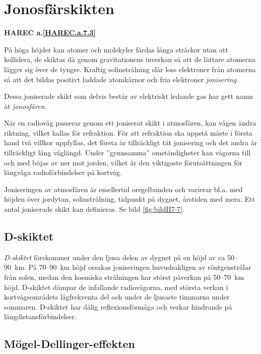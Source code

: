 \section{Jonosfärskikten}
\textbf{
HAREC a.\ref{HAREC.a.7.3}\label{myHAREC.a.7.3}
}

På höga höjder kan atomer och molekyler färdas långa sträckor utan att
kollidera, de skiktas då genom gravitationens inverkan så att de lättare
atomerna lägger sig över de tyngre.
Kraftig solinstrålning slår loss elektroner från atomerna så att det bildas
positivt laddade atomkärnor och fria elektroner \emph{jonisering}.

Dessa joniserade skikt som delvis består av elektriskt ledande gas har
gett namn åt \emph{jonosfären}.

När en radiovåg passerar genom ett joniserat skikt i atmosfären, kan
vågen ändra riktning, vilket kallas för refraktion.  För att
refraktion ska uppstå måste i första hand två villkor uppfyllas, det
första är tillräckligt tät jonisering och det andra är tillräckligt
lång våglängd.
Under ''gynnsamma'' omständigheter kan vågorna till och med böjas av
ner mot jorden, vilket är den viktigaste förutsättningen för långväga
radioförbindelser på kortvåg.

Joniseringen av atmosfären är emellertid oregelbunden och varierar
bl.a. med höjden över jordytan, solinstrålning, tidpunkt på dygnet,
årstiden med mera.  Ett antal joniserade skikt kan definieras.  Se
bild \ref{fig:bildII7-7}.

\subsection{D-skiktet}

\emph{D-skiktet} förekommer under den ljusa delen av dygnet på en höjd av ca
50--90~km.
På 70--90~km höjd orsakas joniseringen huvudsakligen av röntgenstrålar från
solen, medan den kosmiska strålningen har störst påverkan på 50--70~km höjd.
D-skiktet dämpar de infallande radiovågorna, med största verkan i
kortvågsområdets lågfrekventa del och under de ljusaste timmarna under sommaren.
D-skiktet har dålig reflexionsförmåga och verkar hindrande på
långdistansförbindelser.

\subsection{Mögel-Dellinger-effekten}

